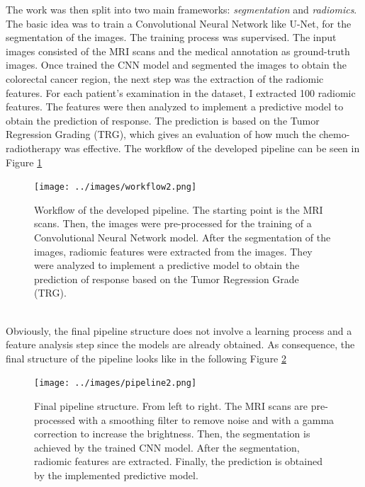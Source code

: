 \documentclass{standalone}
\begin{document}
The work was then split into two main frameworks: \textit{segmentation} and \textit{radiomics}.
The basic idea was to train a Convolutional Neural Network like U-Net, for the segmentation of the images.
The training process was supervised.
The input images consisted of the MRI scans and the medical annotation as ground-truth images.
Once trained the CNN model and segmented the images to obtain the colorectal cancer region, the next step was the extraction of the radiomic features.
For each patient's examination in the dataset, I extracted 100 radiomic features.
The features were then analyzed to implement a predictive model to obtain the prediction of response.
The prediction is based on the Tumor Regression Grading (TRG), which gives an evaluation of how much the chemo-radiotherapy was effective.
The workflow of the developed pipeline can be seen in Figure \ref{workflow}
\begin{figure}[htp]

    \centering
    \texttt{[image: ../images/workflow2.png]}
    
    \caption{Workflow of the developed pipeline. The starting point is the MRI scans. Then, the images were pre-processed for the training of a Convolutional Neural Network model. After the segmentation of the images, radiomic features were extracted from the images. They were analyzed to implement a predictive model to obtain the prediction of response based on the Tumor Regression Grade (TRG).}
    \label{workflow}
    
    \end{figure}
    \\
Obviously, the final pipeline structure does not involve a learning process and a feature analysis step since the models are already obtained.
As consequence, the final structure of the pipeline looks like in the following Figure \ref{pipeline}
\begin{figure}[ht]

    \centering
    \texttt{[image: ../images/pipeline2.png]}
    
    \caption{Final pipeline structure. From left to right. The MRI scans are pre-processed with a smoothing filter to remove noise and with a gamma correction to increase the brightness. Then, the segmentation is achieved by the trained CNN model. After the segmentation, radiomic features are extracted. Finally, the prediction is obtained by the implemented predictive model.}
    \label{pipeline}
    
    \end{figure}
\end{document}
